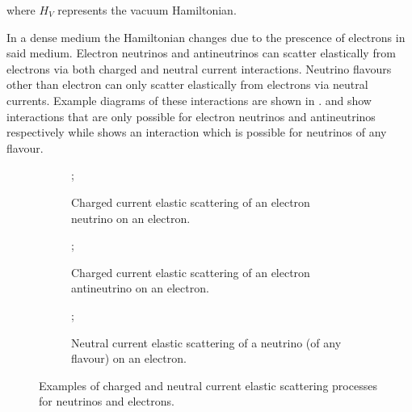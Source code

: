 where $H_{V}$ represents the vacuum Hamiltonian.

In a dense medium the Hamiltonian changes due to the prescence of electrons in said medium.
Electron neutrinos and antineutrinos can scatter elastically from electrons via both charged and neutral current interactions.
Neutrino flavours other than electron can only scatter elastically from electrons via neutral currents.
Example diagrams of these interactions are shown in .
 and  show interactions that are only possible for electron neutrinos and antineutrinos respectively while  shows an interaction which is possible for neutrinos of any flavour.

\begin{figure}[h]
  \begin{subfigure}[t]{0.32\textwidth}
    \centering
    ;
    \caption{Charged current elastic scattering of an electron neutrino on an electron.}
    \label{fig:coherentScattering:nue}
  \end{subfigure}
  \hfill
  \begin{subfigure}[t]{0.32\textwidth}
    ;
    \caption{Charged current elastic scattering of an electron antineutrino on an electron.}
    \label{fig:coherentScattering:anue}
  \end{subfigure}
  \begin{subfigure}[t]{0.32\textwidth}
    \centering
    ;
    \caption{Neutral current elastic scattering of a neutrino (of any flavour) on an electron.}
    \label{fig:coherentScattering:nul}
  \end{subfigure}
  \caption{Examples of charged and neutral current elastic scattering processes for neutrinos and electrons.}
  \label{fig:coherentScattering}
\end{figure}

